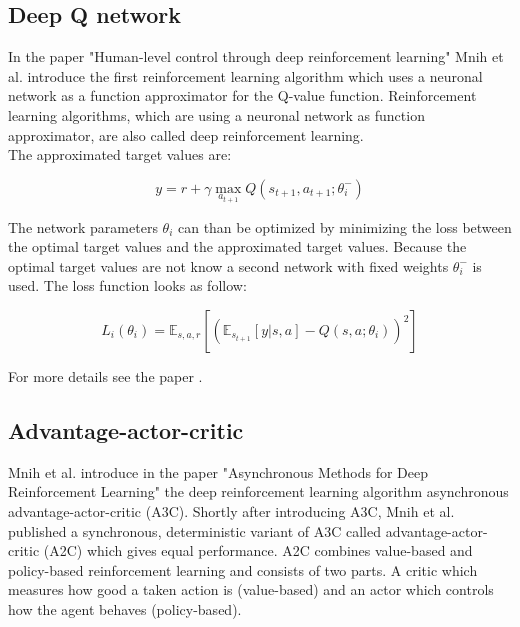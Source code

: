 

\subsection{Deep Q network}

In the paper "Human-level control through deep reinforcement learning" Mnih et al. \cite{dqn} introduce the first reinforcement learning algorithm which uses a neuronal network as a function approximator for the Q-value function. Reinforcement learning algorithms, which are using a neuronal network as function approximator, are also called deep reinforcement learning.\\

The approximated target values are:

\begin{equation} \label{eq:1}
y = r + \gamma \max_{a_{t+1}} Q(s_{t+1}, a_{t+1}; \theta_i^-)
\end{equation}

The network parameters $\theta_i$ can than be optimized by minimizing the loss between the optimal target values and the approximated target values. Because the optimal target values are not know a second network with fixed weights $\theta_i^-$ is used. The loss function looks as follow:

\begin{equation} \label{eq:dqn_loss}
L_i(\theta_i) = \mathbb{E}_{s, a, r}[(\mathbb{E}_{s_{t+1}} [ y | s, a] - Q(s, a; \theta_i))^2]
\end{equation}


For more details see the paper \cite{dqn}.\\



\subsection{Advantage-actor-critic}
\label{sec:a2c}

Mnih et al. introduce in the paper "Asynchronous Methods for Deep Reinforcement Learning" \cite{A3C} the deep reinforcement learning algorithm asynchronous advantage-actor-critic (A3C). Shortly after introducing A3C, Mnih et al. published a synchronous, deterministic variant of A3C called advantage-actor-critic (A2C) which gives equal performance.
A2C combines value-based and policy-based reinforcement learning and consists of two parts. A critic which measures how good a taken action is (value-based) and an actor which controls how the agent behaves (policy-based).\\

